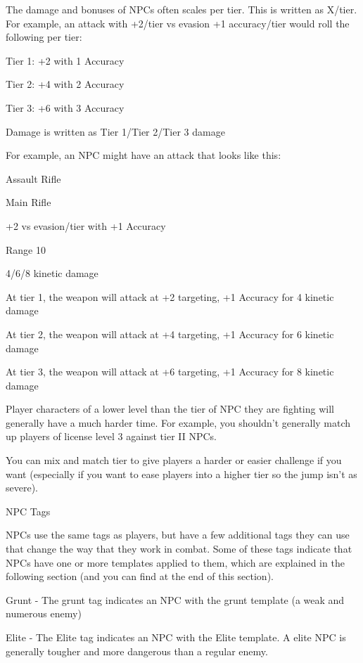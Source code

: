 The damage and bonuses of NPCs often scales per tier. This is written as X/tier. For example, an  
attack with +2/tier vs evasion +1 accuracy/tier would roll the following per tier:
 

Tier 1: +2 with 1 Accuracy
 
Tier 2: +4 with 2 Accuracy
 
Tier 3: +6 with 3 Accuracy
 

Damage is written as Tier 1/Tier 2/Tier 3 damage
 

For example, an NPC might have an attack that looks like this:
 

Assault Rifle
 
Main Rifle
 
+2 vs evasion/tier with +1 Accuracy
 
Range 10
 
4/6/8 kinetic damage
 

At tier 1, the weapon will attack at +2 targeting, +1 Accuracy for 4 kinetic damage
 
At tier 2, the weapon will attack at +4 targeting, +1 Accuracy for 6 kinetic damage
 
At tier 3, the weapon will attack at +6 targeting, +1 Accuracy for 8 kinetic damage
 

Player characters of a lower level than the tier of NPC they are fighting will generally have a much  
harder time. For example, you shouldn’t generally match up players of license level 3 against tier  
II NPCs.
 

                                                                                                                 


You can mix and match tier to give players a harder or easier challenge if you want (especially if  
you want to ease players into a higher tier so the jump isn’t as severe).
 

                                                 NPC Tags  

NPCs use the same tags as players, but have a few additional tags they can use that change the  
way that they work in combat. Some of these tags indicate that NPCs have one or more  
templates applied to them, which are explained in the following section (and you can find at the  
end of this section).
 

Grunt - The grunt tag indicates an NPC with the grunt template (a weak and numerous enemy)
 
Elite - The Elite tag indicates an NPC with the Elite template. A elite NPC is generally tougher  
and more dangerous than a regular enemy.
 
